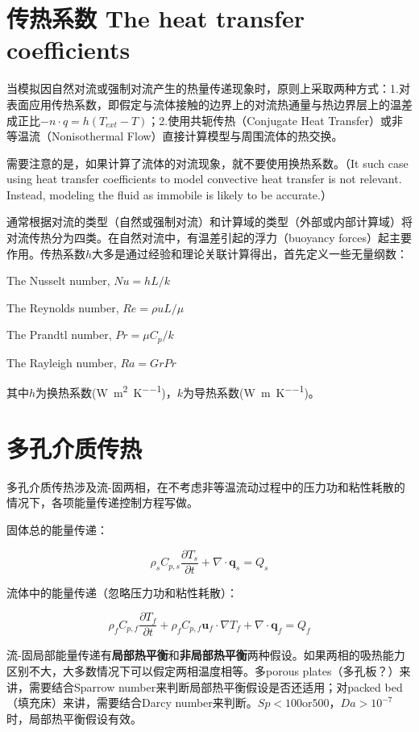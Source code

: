 \section{传热系数 The heat transfer coefficients}

当模拟因自然对流或强制对流产生的热量传递现象时，原则上采取两种方式：1.对表面应用传热系数，即假定与流体接触的边界上的对流热通量与热边界层上的温差成正比$-n\cdot q = h(T_{ext}-T)$；2.使用共轭传热（Conjugate Heat Transfer）或非等温流（Nonisothermal
Flow）直接计算模型与周围流体的热交换。

需要注意的是，如果计算了流体的对流现象，就不要使用换热系数。（It such case using heat transfer coefficients to model convective heat transfer is not relevant. Instead, modeling the fluid as immobile is likely to be accurate.）

通常根据对流的类型（自然或强制对流）和计算域的类型（外部或内部计算域）将对流传热分为四类。在自然对流中，有温差引起的浮力（buoyancy forces）起主要作用。传热系数$h$大多是通过经验和理论关联计算得出，首先定义一些无量纲数：

The Nusselt number, $Nu=hL/k$

The Reynolds number, $Re=\rho uL/\mu$

The Prandtl number, $Pr=\mu C_{p}/k$

The Rayleigh number, $Ra=GrPr$

其中$h$为换热系数(\si{\watt\per\square\meter\per\kelvin})，$k$为导热系数(\si{\watt\per\meter\per\kelvin})。

\section{多孔介质传热}
多孔介质传热涉及流-固两相，在不考虑非等温流动过程中的压力功和粘性耗散的情况下，各项能量传递控制方程写做。

固体总的能量传递：

\begin{equation}\label{solid-heat}
\rho_s C_{p,s} \frac{\partial T_s}{\partial t}+ \nabla\cdot\bm{q}_s = Q_s
\end{equation}

流体中的能量传递（忽略压力功和粘性耗散）：

\begin{equation}\label{fluid-heat}
\rho_f C_{p,f} \frac{\partial T_f}{\partial t} + \rho_f C_{p,f}\bm{u}_f\cdot\nabla T_f + \nabla\cdot\bm{q}_f = Q_f
\end{equation}

流-固局部能量传递有\textbf{局部热平衡}和\textbf{非局部热平衡}两种假设。如果两相的吸热能力区别不大，大多数情况下可以假定两相温度相等。多porous plates（多孔板？）来讲，需要结合Sparrow number来判断局部热平衡假设是否还适用；对packed bed（填充床）来讲，需要结合Darcy number来判断。$ Sp<100 \text{or} 500 $，$ Da>10^{-7} $时，局部热平衡假设有效。

